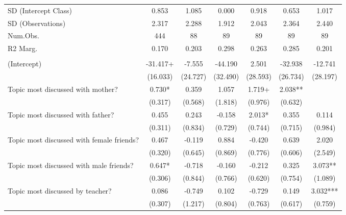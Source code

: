 \documentclass[
  letterpaper,
  DIV=11,
  numbers=noendperiod]{scrreprt}
\begin{document}
\begin{table}
\begin{tabular}[t]{lcccccc}
\hspace{1em}SD (Intercept Class) & 0.853 & 1.085 & 0.000 & 0.918 & 0.653 & 1.017\\
\hspace{1em}SD (Observations) & 2.317 & 2.288 & 1.912 & 2.043 & 2.364 & 2.440\\
\hspace{1em}Num.Obs. & 444 & 88 & 89 & 89 & 89 & 89\\
\hspace{1em}R2 Marg. & 0.170 & 0.203 & 0.298 & 0.263 & 0.285 & 0.201\\
\addlinespace[0.5em]
\multicolumn{7}{l}{\textit{Girls}}\\
\midrule \hspace{1em}(Intercept) & -31.417+ & -7.555 & -44.190 & 2.501 & -32.938 & -12.741\\
\hspace{1em} & (16.033) & (24.727) & (32.490) & (28.593) & (26.734) & (28.197)\\
\hspace{1em}Topic most discussed with mother? & 0.730* & 0.359 & 1.057 & 1.719+ & 2.038** & \\
\hspace{1em} & (0.317) & (0.568) & (1.818) & (0.976) & (0.632) & \\
\hspace{1em}Topic most discussed with father? & 0.455 & 0.243 & -0.158 & 2.013* & 0.355 & 0.114\\
\hspace{1em} & (0.311) & (0.834) & (0.729) & (0.744) & (0.715) & (0.984)\\
\hspace{1em}Topic most discussed with female friends? & 0.467 & -0.119 & 0.884 & -0.420 & 0.639 & 2.020\\
\hspace{1em} & (0.320) & (0.645) & (0.869) & (0.776) & (0.606) & (2.549)\\
\hspace{1em}Topic most discussed with male friends? & 0.647* & -0.718 & -0.160 & -0.212 & 0.325 & 3.073**\\
\hspace{1em} & (0.306) & (0.844) & (0.766) & (0.620) & (0.754) & (1.089)\\
\hspace{1em}Topic most discussed by teacher? & 0.086 & -0.749 & 0.102 & -0.729 & 0.149 & 3.032***\\
\hspace{1em} & (0.307) & (1.217) & (0.804) & (0.763) & (0.617) & (0.759)\\

\end{tabular}
\end{table}
\end{document}
